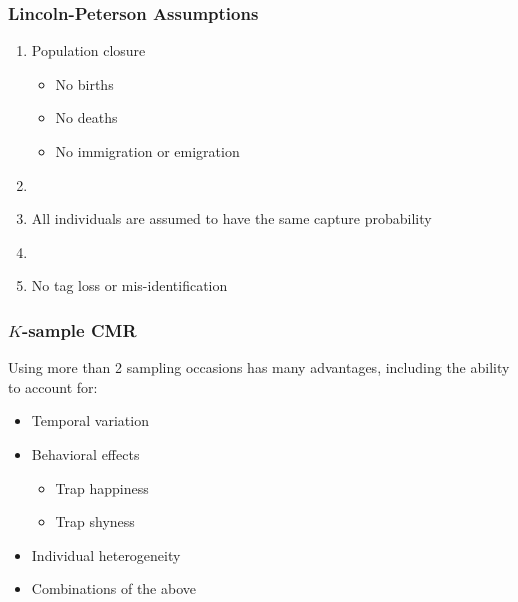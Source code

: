 \documentclass[color=usenames,dvipsnames]{beamer}\usepackage[]{graphicx}\usepackage[]{color}
\begin{document}





\begin{frame}
  \frametitle{Lincoln-Peterson Assumptions}
  \large
  \begin{enumerate}[\bf (1)]
    \item<1-> Population closure
      \begin{itemize}
        \large
        \item No births
        \item No deaths
        \item No immigration or emigration
      \end{itemize}
    \item[]
    \item<2-> All individuals are assumed to have the same capture probability
    \item[]
    \item<3-> No tag loss or mis-identification
  \end{enumerate}
\end{frame}









\begin{frame}
  \frametitle{$K$-sample CMR}
  \large
  Using more than 2 sampling occasions has many advantages, including
  the ability to account for:
  \begin{itemize}[<+->]
    \large
    \item Temporal variation
    \item Behavioral effects
      \begin{itemize}
        \large
        \item Trap happiness
        \item Trap shyness
      \end{itemize}
    \item Individual heterogeneity
    \item Combinations of the above
  \end{itemize}
\end{frame}
\end{document}
